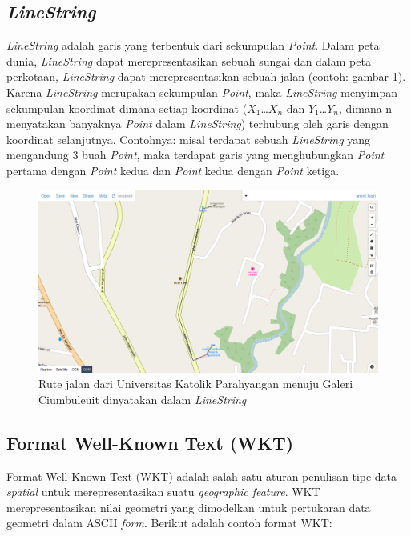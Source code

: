 \subsection{\textit{LineString}}
\label{sec:linestring}
\textit{LineString} adalah garis yang terbentuk dari sekumpulan \textit{Point}\cite{mysqlspatial}. Dalam peta dunia, \textit{LineString} dapat merepresentasikan sebuah sungai dan dalam peta perkotaan, \textit{LineString} dapat merepresentasikan sebuah jalan (contoh: gambar \ref{fig:2_linestring}). Karena \textit{LineString} merupakan sekumpulan \textit{Point}, maka \textit{LineString} menyimpan sekumpulan koordinat dimana setiap koordinat ($X_{1}$\ldots$X_{n}$ dan $Y_{1}$\ldots$Y_{n}$, dimana n menyatakan banyaknya \textit{Point} dalam \textit{LineString}) terhubung oleh garis dengan koordinat selanjutnya. Contohnya: misal terdapat sebuah \textit{LineString} yang mengandung 3 buah \textit{Point}, maka terdapat garis yang menghubungkan \textit{Point} pertama dengan \textit{Point} kedua dan \textit{Point} kedua dengan \textit{Point} ketiga.

\begin{figure}[htbp]
	\centering
		\includegraphics[scale=0.35]{Gambar/2_linestring.png}
	\caption{Rute jalan dari Universitas Katolik Parahyangan menuju Galeri Ciumbuleuit dinyatakan dalam \textit{LineString}\cite{geojson}}
	\label{fig:2_linestring}
\end{figure}

\subsection{Format Well-Known Text (WKT)}
\label{sec:wktformat}
Format Well-Known Text (WKT) adalah salah satu aturan penulisan tipe data \textit{spatial} untuk merepresentasikan suatu \textit{geographic feature}\cite{mysqlspatial}. WKT merepresentasikan nilai geometri yang dimodelkan untuk pertukaran data geometri dalam ASCII \textit{form}. Berikut adalah contoh format WKT:


